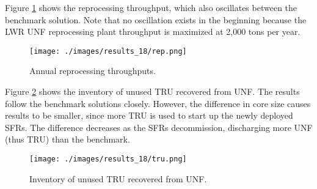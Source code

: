 Figure \ref{fig:rep} shows the reprocessing throughput, which also oscillates between
the benchmark solution. Note that no oscillation exists in the beginning because the
\gls{LWR} \gls{UNF} reprocessing plant throughput is maximized at 2,000 tons per year.

\begin{figure}[htbp!]
    \begin{center}
        \texttt{[image: ./images/results\_18/rep.png]}
    \end{center}
        \caption{Annual reprocessing throughputs.}
    \label{fig:rep}
\end{figure}


Figure \ref{fig:tru} shows the inventory of unused \gls{TRU} recovered from \gls{UNF}.
The \Cyclus results follow the benchmark solutions closely. However, the difference
in core size causes \Cyclus results to be smaller, since more \gls{TRU} is used to
start up the newly deployed \glspl{SFR}. The difference decreases as the
\glspl{SFR} decommission, discharging more \gls{UNF} (thus \gls{TRU}) than
the benchmark.

\begin{figure}[htbp!]
	\begin{center}
		\texttt{[image: ./images/results\_18/tru.png]}
	\end{center}
        \caption{Inventory of unused \gls{TRU} recovered from \gls{UNF}.}
	\label{fig:tru}
\end{figure}

